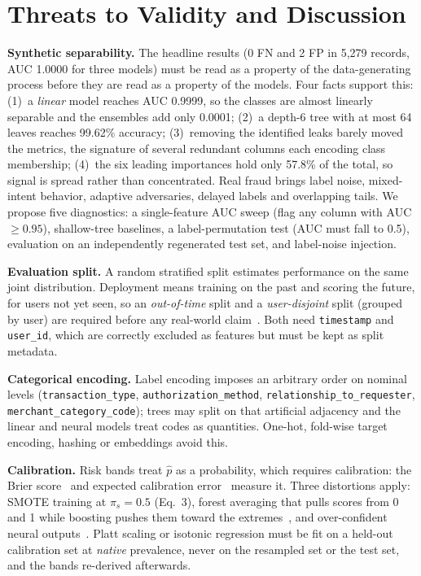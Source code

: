 \documentclass[conference]{IEEEtran}
\begin{document}
\section{Threats to Validity and Discussion}\label{sec:threats}
\textbf{Synthetic separability.} The headline results (0 FN and 2 FP in 5,279 records, AUC 1.0000 for three models) must be read as a property of the data-generating process before they are read as a property of the models. Four facts support this: (1)~a \emph{linear} model reaches AUC 0.9999, so the classes are almost linearly separable and the ensembles add only 0.0001; (2)~a depth-6 tree with at most 64 leaves reaches 99.62\% accuracy; (3)~removing the identified leaks barely moved the metrics, the signature of several redundant columns each encoding class membership; (4)~the six leading importances hold only 57.8\% of the total, so signal is spread rather than concentrated. Real fraud brings label noise, mixed-intent behavior, adaptive adversaries, delayed labels and overlapping tails. We propose five diagnostics: a single-feature AUC sweep (flag any column with AUC $\ge0.95$), shallow-tree baselines, a label-permutation test (AUC must fall to 0.5), evaluation on an independently regenerated test set, and label-noise injection.

\textbf{Evaluation split.} A random stratified split estimates performance on the same joint distribution. Deployment means training on the past and scoring the future, for users not yet seen, so an \emph{out-of-time} split and a \emph{user-disjoint} split (grouped by user) are required before any real-world claim~\cite{gama14}. Both need \texttt{timestamp} and \texttt{user\_\allowbreak{}id}, which are correctly excluded as features but must be kept as split metadata.

\textbf{Categorical encoding.} Label encoding imposes an arbitrary order on nominal levels (\texttt{transaction\_\allowbreak{}type}, \texttt{authorization\_\allowbreak{}method}, \texttt{relationship\_\allowbreak{}to\_\allowbreak{}requester}, \texttt{merchant\_\allowbreak{}category\_\allowbreak{}code}); trees may split on that artificial adjacency and the linear and neural models treat codes as quantities. One-hot, fold-wise target encoding, hashing or embeddings avoid this.

\textbf{Calibration.} Risk bands treat $\hat p$ as a probability, which requires calibration: the Brier score~\cite{brier50} and expected calibration error~\cite{guo17} measure it. Three distortions apply: SMOTE training at $\pi_s=0.5$ (Eq.~3), forest averaging that pulls scores from 0 and 1 while boosting pushes them toward the extremes~\cite{niculescu05}, and over-confident neural outputs~\cite{guo17}. Platt scaling or isotonic regression must be fit on a held-out calibration set at \emph{native} prevalence, never on the resampled set or the test set, and the bands re-derived afterwards.
\end{document}
